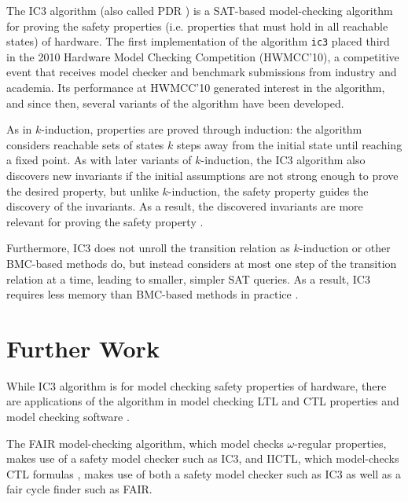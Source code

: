 \documentclass[12pt,a4paper,twoside,openright]{report}
\begin{document}

The IC3 algorithm (also called PDR \cite{een11}) is a SAT-based model-checking
algorithm for proving the safety properties (i.e. properties that must hold
in all reachable states) of hardware.
The first implementation of the algorithm \verb,ic3, placed third in
the 2010 Hardware Model Checking Competition (HWMCC'10), a competitive event
that receives model checker and benchmark submissions from industry and
academia. Its performance at HWMCC'10 generated interest in the algorithm, and
since then, several variants of the algorithm have been developed.

As in $k$-induction, properties are proved through induction:
the algorithm considers reachable sets of states $k$ steps away from the
initial state until reaching a fixed point.
As with later variants of $k$-induction, the IC3 algorithm also discovers
new invariants if the initial assumptions are not strong enough to prove
the desired property, but unlike $k$-induction, the safety property guides
the discovery of the invariants. As a result, the discovered invariants
are more relevant for proving the safety property \cite{bradley12}.

Furthermore, IC3 does not unroll the transition relation as $k$-induction
or other BMC-based methods do, but instead considers at most one step
of the transition relation at a time, leading to smaller,
simpler SAT queries. As a result, IC3 requires less memory than BMC-based
methods in practice \cite{bradley12}.


\section{Further Work}



While IC3 algorithm is for model checking safety properties of hardware,
there are applications of the algorithm in model checking LTL and CTL
properties and model checking software \cite{bradley12}.

The FAIR model-checking algorithm, which model checks $\omega$-regular
properties, makes use of a safety model checker such as IC3, and IICTL,
which model-checks CTL formulas \cite{hassan12}, makes use of both a
safety model checker such as IC3 as well as a fair cycle finder such as
FAIR.
\end{document}

